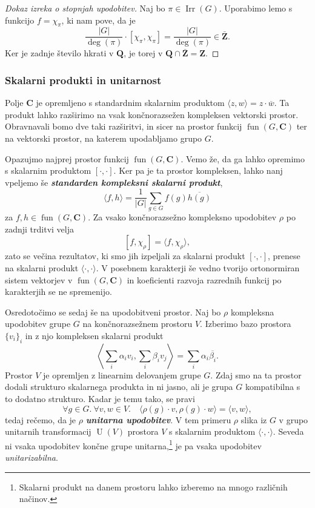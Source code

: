 \documentclass[11pt]{book}
\def\ZZ{\mathbf{Z}}
\def\QQ{\mathbf{Q}}
\def\CC{\mathbf{C}}
\DeclareMathOperator\Irr{Irr}
\DeclareMathOperator\fun{fun}
\DeclareMathOperator\U{U}
\def\definicija{\color{rdeca}\bf\em}
\theoremstyle{definition}
\theoremstyle{zgled}
\theoremstyle{odprtproblem}
\theoremstyle{domacanaloga}
\newenvironment{dokaz}
    {\color{siva}\begin{proof}}
    {\end{proof}}
\theoremstyle{izrek}
\begin{document}
    \begin{dokaz}[Dokaz izreka o stopnjah upodobitev]
    Naj bo $\pi \in \Irr(G)$. Uporabimo lemo s funkcijo $f = \chi_{\pi}$, ki nam pove, da je 
    \[
        \frac{|G|}{\deg(\pi)} \cdot [ \chi_{\pi}, \chi_{\pi} ] = \frac{|G|}{\deg(\pi)} \in \bar{\ZZ}.
    \]
    Ker je zadnje število hkrati v $\QQ$, je torej v $\QQ \cap \bar{\ZZ} = \ZZ$.
    \end{dokaz}

\subsubsection{Skalarni produkti in unitarnost}

Polje $\CC$ je opremljeno s standardnim skalarnim produktom $\langle z, w \rangle = z \cdot \overline{w}$. Ta produkt lahko razširimo na vsak končnorazsežen kompleksen vektorski prostor. Obravnavali bomo dve taki razširitvi, in sicer na prostor funkcij $\fun(G,\CC)$ ter na vektorski prostor, na katerem upodabljamo grupo $G$.

Opazujmo najprej prostor funkcij $\fun(G,\CC)$. Vemo že, da ga lahko opremimo s skalarnim produktom $[\cdot, \cdot]$. Ker pa je ta prostor kompleksen, lahko nanj vpeljemo še {\definicija standarden kompleksni skalarni produkt},
\[
    \langle f, h \rangle = \frac{1}{|G|} \sum_{g \in G} f(g) \overline{h(g)}
\]
za $f,h \in \fun(G,\CC)$. Za vsako končnorazsežno kompleksno upodobitev $\rho$  po zadnji trditvi velja
\[
    [f, \chi_{\rho}] = \langle f, \chi_{\rho} \rangle,
\]
zato se večina rezultatov, ki smo jih izpeljali za skalarni produkt $[\cdot, \cdot]$, prenese na skalarni produkt $\langle \cdot, \cdot \rangle$. V posebnem  karakterji še vedno tvorijo ortonormiran sistem vektorjev v $\fun(G,\CC)$ in koeficienti razvoja razrednih funkcij po karakterjih se ne spremenijo.

Osredotočimo se sedaj še na upodobitveni prostor. Naj bo $\rho$ kompleksna upodobitev grupe $G$ na končnorazsežnem prostoru $V$. Izberimo bazo prostora $\{ v_i \}_{i}$ in z njo kompleksen skalarni produkt
\[
    \left\langle \sum_i \alpha_i v_i, \sum_i \beta_i v_j \right\rangle = \sum_i \alpha_i \overline{\beta_i}.
\]
Prostor $V$ je opremljen z linearnim delovanjem grupe $G$. Zdaj smo na ta prostor dodali strukturo skalarnega produkta in ni jasno, ali je grupa $G$ kompatibilna s to dodatno strukturo. Kadar je temu tako, se pravi
\[
    \forall g \in G. \ \forall v, w \in V. \quad \langle \rho(g) \cdot v, \rho(g) \cdot w \rangle = \langle v, w \rangle,
\]
tedaj rečemo, da je $\rho$ {\definicija unitarna upodobitev}. V tem primeru $\rho$ slika iz $G$ v grupo unitarnih transformacij $\U(V)$ prostora $V$ s skalarnim produktom $\langle \cdot, \cdot \rangle$. Seveda ni vsaka upodobitev končne grupe unitarna,\footnote{Skalarni produkt na danem prostoru lahko izberemo na mnogo različnih načinov.} je pa vsaka upodobitev \emph{unitarizabilna}.
\end{document}
